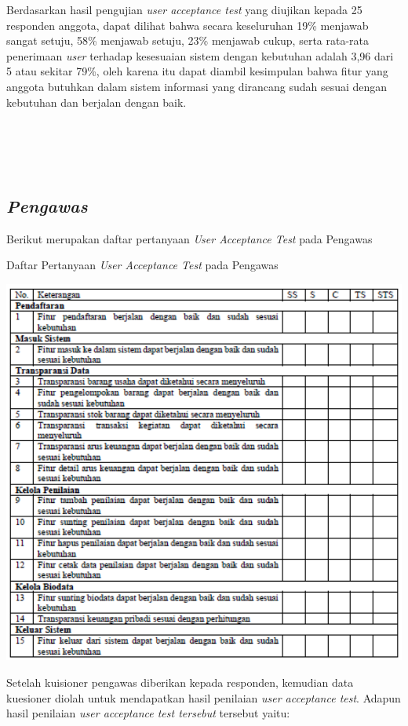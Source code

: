 Berdasarkan hasil pengujian \textit{user acceptance test} yang diujikan kepada 25 responden anggota, dapat dilihat bahwa secara keseluruhan 19\% menjawab sangat setuju, 58\% menjawab setuju, 23\% menjawab cukup, serta rata-rata penerimaan \textit{user} terhadap kesesuaian sistem dengan kebutuhan adalah 3,96 dari 5 atau sekitar 79\%, oleh karena itu dapat diambil kesimpulan bahwa fitur yang anggota butuhkan dalam sistem informasi yang dirancang sudah sesuai dengan kebutuhan dan berjalan dengan baik. 
\\
\\
\\
\\
\\

\subsection{\textit{Pengawas}}
Berikut merupakan daftar pertanyaan \textit{User Acceptance Test} pada Pengawas

\begin{table}[H]
	\centering
	\caption{Daftar Pertanyaan \textit{User Acceptance Test} pada Pengawas}
	\includegraphics[width=1\textwidth]{gambar/Tabel_Pengawas}
\end{table}

Setelah kuisioner pengawas diberikan kepada responden, kemudian data kuesioner diolah untuk mendapatkan hasil penilaian \textit{user acceptance test}. Adapun hasil penilaian \textit{user acceptance test tersebut} tersebut yaitu:

